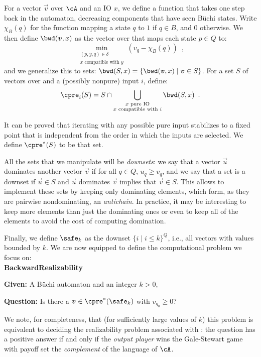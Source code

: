 \documentclass[runningheads,a4paper]{llncs}
\begin{document}
For a vector \(\vec{v}\) over \(\cA\) and an IO \(x\), we define a function that takes
one step back in the automaton, decreasing components that have seen Büchi
states.  Write \(\chi_B(q)\) for the function mapping a state \(q\) to \(1\) if
\(q \in B\), and \(0\) otherwise.  We then define \(\bwd(\vec{v}, x)\) as the vector
over \cA that maps each state \(p \in Q\) to:
\[\min_{\substack{(p, y, q) \in \delta\\ x \text{ compatible with } y}} \left(v_q -
  \chi_B(q)\right)\enspace,\]
and we generalize this to sets: \(\bwd(S, x) = \{\bwd(\vec{v}, x) \mid \vec{v}
\in S\}\).
%
For a set \(S\) of vectors over \cA and a (possibly nonpure) input \(i\), define:
\[\cpre_i(S) = S \cap \bigcup_{\substack{x \text{ pure IO}\\x \text{ compatible with } i}} \bwd(S, x)\enspace.\]

It can be proved that iterating \cpre with any possible pure input stabilizes to
a fixed point that is independent from the order in which the inputs are
selected.  We define \(\cpre^*(S)\) to be that set.

All the sets that we manipulate will be \emph{downsets}: we say that a vector
\(\vec{u}\) dominates another vector \(\vec{v}\) if for all \(q \in Q\),
\(u_q \geq v_q\), and we say that a set is a downset if \(\vec{u} \in S\) and
\(\vec{u}\) dominates \(\vec{v}\) implies that \(\vec{v} \in S\).  This allows to
implement these sets by keeping only dominating elements, which form, as they
are pairwise nondominating, an \emph{antichain}.  In practice, it may be
interesting to keep more elements than just the dominating ones or even to keep
all of the elements to avoid the cost of computing domination.

Finally, we define \(\safe_k\) as the downset \(\{i \mid i \leq k\}^Q\), i.e., all vectors
with values bounded by \(k\).
We are now equipped to define the computational problem we focus on:\\[0.5em]
\textbf{BackwardRealizability}
\begin{compactitem}
\item \textbf{Given:} A Büchi automaton \cA and an integer \(k > 0\),
\item \textbf{Question:} Is there a \(\vec{v} \in \cpre^*(\safe_k)\) with \(v_{q_0} \geq
  0\)?
\end{compactitem}

\vspace{0.5em}

We note, for completeness, that (for sufficiently large values of $k$) this
problem is equivalent to deciding the realizability problem associated with
\cA: the question has a positive answer if and only if the \emph{output player} wins the
Gale-Stewart game with payoff set the \emph{complement} of the language of \(\cA\).
\end{document}
